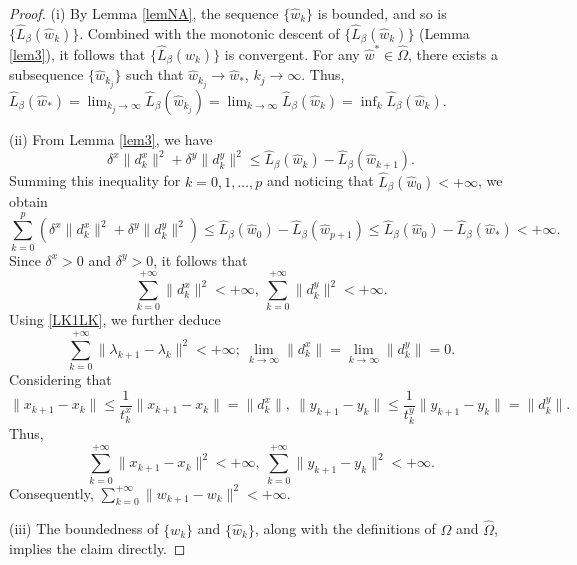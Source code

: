 \documentclass[pdflatex,sn-mathphys-num]{sn-jnl}%
\theoremstyle{thmstyleone}%
\theoremstyle{thmstyletwo}%
\theoremstyle{thmstylethree}%
\begin{document}
\begin{proof}
(i) By Lemma \ref{lemNA}, the sequence $\{\hat{w}_{k}\}$ is bounded, and so is $\{\hat{L}_{\beta}(\hat{w}_{k})\}$. Combined with the monotonic descent of $\{\hat{L}_{\beta}(\hat{w}_{k})\}$ (Lemma \ref{lem3}), it follows that $\{\hat{L}_{\beta}(\hat{w}_{k})\}$ is convergent. For any $\hat{w}^*\in \hat{\Omega}$, there exists a subsequence $\{\hat{w}_{k_j}\}$ such that $\hat{w}_{k_j} \to \hat{w}_*$, $k_j\to\infty$. Thus,
$\hat{L}_{\beta}(\hat{w}_*)=\lim_{k_j \to \infty }\hat{L}_{\beta}(\hat{w}_{k_j})=\lim_{k \to \infty }\hat{L}_{\beta}(\hat{w}_{k})=\inf_{k}\hat{L}_{\beta}(\hat{w}_k)$.

(ii) From Lemma \ref{lem3}, we have
\[	\delta^x\|d_{k}^x\|^2+\delta^y\|d_{k}^y\|^2\leq\hat{L}_{\beta}(\hat{w}_{k}) -\hat{L}_{\beta}(\hat{w}_{k+1}).\]
Summing this inequality for $k=0,1, \dots, p$ and noticing that $\hat{L}_{\beta}(\hat {w}_{0})<+\infty$, we obtain
\[	
\sum_{k=0}^p(\delta^x\|d_{k}^x\|^2+\delta^y\|d_{k}^y\|^2)\leq\hat{L}_{\beta}(\hat{w}_{0}) -\hat{L}_{\beta}(\hat{w}_{p+1})
\leq\hat{L}_{\beta}(\hat{w}_{0}) -\hat{L}_{\beta}(\hat{w}_{*})<+\infty.
\]
Since $\delta^x>0$ and $\delta^y>0$, it follows that
\[\sum_{k=0}^{+\infty} \|d_k^x\|^2<+\infty,~\sum_{k=0}^{+\infty} \|d_k^y\|^2<+\infty.\]
Using \eqref{LK1LK}, we further deduce
\[
\sum_{k=0}^{+\infty} \|{\lambda}_{k+1}-\lambda_{k}\|^2<+\infty;\ \lim_{k\to\infty}\|d_k^x\|=\lim_{k\to\infty}\|d_k^y\|=0.
\]
Considering that
\begin{equation}\label{xleqd}
\|x_{k+1}-x_k\|\leq \frac{1}{t_k^x}\|{x}_{k+1}-x_{k}\|=\|d_k^x\|,\ \|y_{k+1}-y_k\|\leq \frac{1}{t_k^y}\|{y}_{k+1}-y_{k}\|=\|d_k^y\|.
\end{equation}
Thus,
\[\sum_{k=0}^{+\infty}\|x_{k+1}-x_k\|^2<+\infty,~\sum_{k=0}^{+\infty}\|y_{k+1}-y_k\|^2<+\infty.\]
Consequently, $\sum_{k=0}^{+\infty}\|w_{k+1}-w_k\|^2<+\infty$.

(iii) The boundedness of $\{w_{k}\}$ and $\{\hat{w}_{k}\}$, along with the definitions of $\Omega$ and $\hat{\Omega}$, implies the claim directly.


\end{proof}
\end{document}
